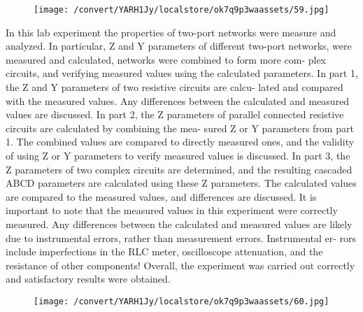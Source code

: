 \documentclass[12pt]{report}
\begin{document}
\par

\vspace{10pt}

\begin{figure}[h]

\texttt{[image: /convert/YARH1Jy/localstore/ok7q9p3waassets/59.jpg]}

\centering

\end{figure}

    In this lab experiment the properties of two-port networks were measure and  analyzed. In particular, Z and Y parameters of different two-port networks,  were measured and calculated, networks were combined to form more com-  plex circuits, and verifying measured values using the calculated parameters.   In part 1, the Z and Y parameters of two resistive circuits are calcu-  lated and compared with the measured values. Any differences between the  calculated and measured values are discussed. In part 2, the Z parameters  of parallel connected resistive circuits are calculated by combining the mea-  sured Z or Y parameters from part 1. The combined values are compared to  directly measured ones, and the validity of using Z or Y parameters to verify  measured values is discussed. In part 3, the Z parameters of two complex  circuits are determined, and the resulting cascaded ABCD parameters are  calculated using these Z parameters. The calculated values are compared  to the measured values, and differences are discussed. It is important to  note that the measured values in this experiment were correctly measured.  Any differences between the calculated and measured values are likely due  to instrumental errors, rather than measurement errors. Instrumental er-  rors include imperfections in the RLC meter, oscilloscope attenuation, and  the resistance of other components! Overall, the experiment was carried out  correctly and satisfactory results were obtained. 

\vspace{10pt}

\begin{figure}[h]

\texttt{[image: /convert/YARH1Jy/localstore/ok7q9p3waassets/60.jpg]}

\centering

\end{figure}

\par
\end{document}
